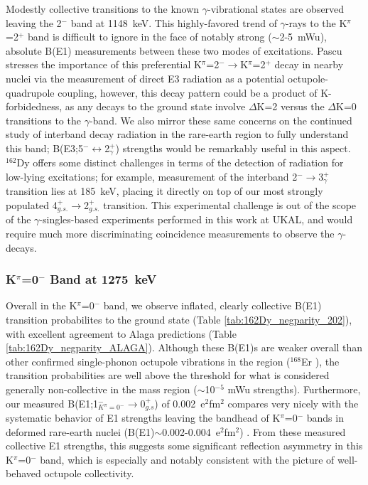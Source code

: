 Modestly collective transitions to the known $\gamma$-vibrational states are observed leaving the 2$^-$ band at 1148~keV. This highly-favored trend of $\gamma$-rays to the K$^\pi$=2$^+$ band is difficult to ignore in the face of notably strong ($\sim$2-5~mWu), absolute B(E1) measurements between these two modes of excitations. Pascu \cite{Pascu_octupole_2015} stresses the importance of this preferential K$^\pi$=2$^-\rightarrow$K$^\pi$=2$^+$ decay in nearby nuclei via the measurement of direct E3 radiation as a potential octupole-quadrupole coupling, however, this decay pattern could be a product of K-forbidedness, as any decays to the ground state involve $\Delta$K=2 versus the $\Delta$K=0 transitions to the $\gamma$-band. We also mirror these same concerns on the continued study of interband decay radiation in the rare-earth region to fully understand this band; B(E3;5$^-\leftrightarrow$2$^+_\gamma$) strengths would be remarkably useful in this aspect. $^{162}$Dy offers some distinct challenges in terms of the detection of radiation for low-lying excitations; for example, measurement of the interband 2$^-\rightarrow$3$^+_\gamma$ transition lies at 185~keV, placing it directly on top of our most strongly populated 4$^+_{g.s.}\rightarrow$2$^+_{g.s.}$ transition. This experimental challenge is out of the scope of the $\gamma$-singles-based experiments performed in this work at UKAL, and would require much more discriminating coincidence measurements to observe the $\gamma$-decays.



\subsubsection{K$^\pi$=0$^-$ Band at 1275~keV}

Overall in the K$^\pi$=0$^-$ band, we observe inflated, clearly collective B(E1) transition probabilites to the ground state (Table \ref{tab:162Dy_negparity_202}), with excellent agreement to Alaga predictions (Table \ref{tab:162Dy_negparity_ALAGA}). Although these B(E1)s are weaker overall than other confirmed single-phonon octupole vibrations in the region ($^{168}$Er \cite{MCGOWAN_168Er_E3}), the transition probabilities are well above the threshold for what is considered generally non-collective in the mass region ($\sim$10$^{-5}$ mWu strengths). Furthermore, our measured B(E1;1$^-_{K^\pi=0^-}\rightarrow$0$^+_{g.s}$) of 0.002~e$^2$fm$^2$ compares very nicely with the systematic behavior of E1 strengths leaving the bandhead of K$^\pi$=0$^-$ bands in deformed rare-earth nuclei (B(E1)$\sim$0.002-0.004~e$^2$fm$^2$) \cite{Borner_collective1999}. From these measured collective E1 strengths, this suggests some significant reflection asymmetry in this K$^\pi$=0$^-$ band, which is especially and notably consistent with the picture of well-behaved octupole collectivity. 

